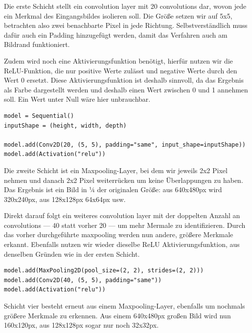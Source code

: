 \documentclass[conference]{IEEEtran}
\begin{document}
Die erste Schicht stellt ein convolution layer mit 20 convolutions dar, wovon jede ein Merkmal des Eingangsbildes isolieren soll.
Die Größe setzen wir auf 5x5, betrachten also zwei benachbarte Pixel in jede Richtung.
Selbstverständlich muss dafür auch ein Padding hinzugefügt werden, damit das Verfahren auch am Bildrand funktioniert. 

Zudem wird noch eine Aktivierungsfunktion benötigt, hierfür nutzen wir die ReLU-Funktion, die nur positive Werte zulässt und negative Werte durch den Wert 0 ersetzt.
Diese Aktivierungsfunktion ist deshalb sinnvoll, da das Ergebnis als Farbe dargestellt werden und deshalb einen Wert zwischen 0 und 1 annehmen soll.
Ein Wert unter Null wäre hier unbrauchbar.

\begin{verbatim}
model = Sequential()
inputShape = (height, width, depth)

model.add(Conv2D(20, (5, 5), padding="same", input_shape=inputShape))
model.add(Activation("relu"))
\end{verbatim}

Die zweite Schicht ist ein Maxpooling-Layer, bei dem wir jeweils 2x2 Pixel nehmen und danach 2x2 Pixel weiterrücken um keine Überlappungen zu haben.
Das Ergebnis ist ein Bild in ¼ der originalen Größe: aus 640x480px wird 320x240px, aus 128x128px 64x64px usw.

Direkt darauf folgt ein weiteres convolution layer mit der doppelten Anzahl an convolutions — 40 statt vorher 20 — um mehr Mermale zu identifizieren.
Durch das vorher durchgeführte maxpooling werden nun andere, größere Merkmale erkannt.
Ebenfalls nutzen wir wieder dieselbe ReLU Aktivierungsfunktion, aus denselben Gründen wie in der ersten Schicht.

\begin{verbatim}
model.add(MaxPooling2D(pool_size=(2, 2), strides=(2, 2)))
model.add(Conv2D(40, (5, 5), padding="same"))
model.add(Activation("relu"))
\end{verbatim}



Schicht vier besteht erneut aus einem Maxpooling-Layer, ebenfalls um nochmals größere Merkmale zu erkennen.
Aus einem 640x480px großen Bild wird nun 160x120px, aus 128x128px sogar nur noch 32x32px.
\end{document}
